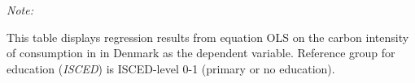\begin{table}[htbp!]
\begin{adjustbox}{width = 1\textwidth, max height = 0.95\textheight, center}
\begin{threeparttable}[b]
         \begin{tablenotes}\item \medskip \textit{Note:}
            \item This table displays regression results from equation OLS on the carbon intensity of consumption in  in Denmark as the dependent variable. Reference group for education (\textit{ISCED}) is ISCED-level 0-1 (primary or no education).
         \end{tablenotes}
      \end{threeparttable}
   \end{adjustbox}
\end{table}


